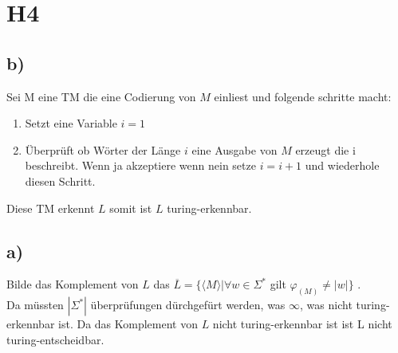\section*{H4}

\subsection{b)}
Sei M eine TM die eine Codierung von $M$ einliest und folgende schritte macht:\\
\begin{enumerate}
\item
Setzt eine Variable $i=1$
\item
Überprüft ob Wörter der Länge $i$ eine Ausgabe von $M$ erzeugt die i beschreibt. Wenn ja akzeptiere wenn nein setze $i=i+1$ und wiederhole diesen Schritt.
\end{enumerate}
Diese TM erkennt $L$ somit ist $L$ turing-erkennbar.

\subsection{a)}
Bilde das Komplement von $L$ das $\overline{L} = \{ \langle M \rangle | \forall w \in \Sigma^* $ gilt $ \varphi_{(M)} \neq |w| \}$ . \\
Da müssten $|\Sigma^*|$ überprüfungen dürchgefürt werden, was $\infty$, was nicht turing-erkennbar ist.
Da das Komplement von $L$ nicht turing-erkennbar ist ist L nicht turing-entscheidbar.
